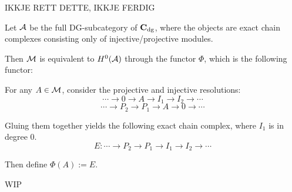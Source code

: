 {\color{red}
IKKJE RETT DETTE, IKKJE FERDIG

Let \( {\mathcal{A}} \) be the full DG-subcategory of \( \operatorname{\mathbf{C}}_{\operatorname{dg}} \), where the objects are exact chain complexes consisting only of injective/projective modules.

Then \( {\mathcal{M}} \) is equivalent to \( H^0({\mathcal{A}}) \) through the functor \( \Phi \), which is the following functor:

For any \( A \in {\mathcal{M}} \), consider the projective and injective resolutions:
\[
    \cdots \to 0 \to A \to I_1 \to I_2 \to \cdots
\]
\[
    \cdots \to P_2 \to P_1 \to A \to 0 \to \cdots
\]

Gluing them together yields the following exact chain complex, where \( I_1 \) is in degree \( 0 \).
\[
    E: \cdots \to P_2 \to P_1 \to I_1 \to I_2 \to \cdots
\]

Then define \( \Phi(A) := E \).

WIP
}



